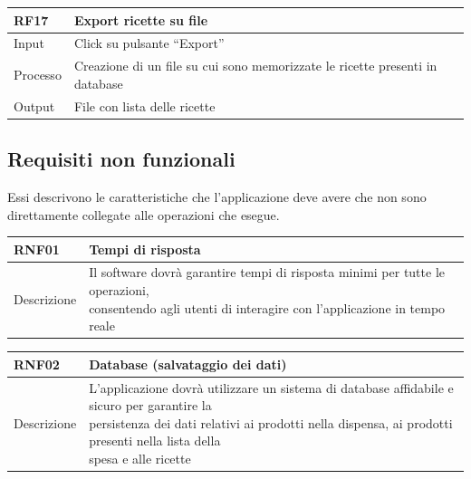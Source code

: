 \documentclass{article}
\begin{document}
\begin{table}[H]
    \begin{flushleft}
      \begin{tabular}{l|l}
        \toprule
        \textbf{RF17} & \textbf{Export ricette su file}\\
        \midrule
        Input & Click su pulsante “Export”\\
        Processo & Creazione di un file su cui sono memorizzate le ricette presenti in database\\
        Output & File con lista delle ricette\\
        \bottomrule
      \end{tabular}
    \end{flushleft}
\end{table}

\subsection{Requisiti non funzionali}

Essi descrivono le caratteristiche che l'applicazione deve avere che non sono direttamente collegate alle operazioni che esegue.

\begin{table}[H]
  \begin{flushleft}
    \begin{tabular}{l|l}
      \toprule
      \textbf{RNF01} & \textbf{Tempi di risposta}\\
      \midrule
      Descrizione & \makecell{Il software dovrà garantire tempi di risposta minimi per tutte le operazioni,\\ consentendo agli utenti di interagire con l'applicazione in tempo reale}\\
      \bottomrule
    \end{tabular}
  \end{flushleft}
\end{table}

\begin{table}[H]
  \begin{flushleft}
    \begin{tabular}{l|l}
      \toprule
      \textbf{RNF02} & \textbf{Database (salvataggio dei dati)}\\
      \midrule
      Descrizione & \makecell{L'applicazione dovrà utilizzare un sistema di database affidabile e sicuro per garantire la \\ persistenza dei dati relativi ai prodotti nella dispensa, ai prodotti presenti nella lista della \\ spesa e alle ricette}\\
      \bottomrule
    \end{tabular}
  \end{flushleft}
\end{table}
\end{document}
